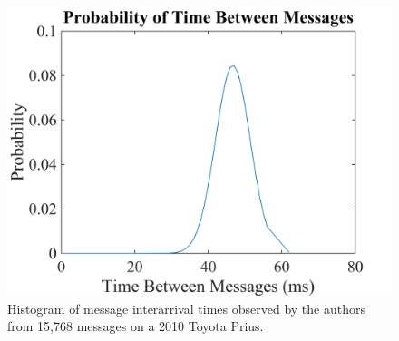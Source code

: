 	\selectfont
	\begin{figure}
		\centering
		\includegraphics[width=\columnwidth]{figures/pdf.png}
		\caption{{\selectfont Histogram 
		of message interarrival times observed by the authors from 
		15,768 messages on a 2010 Toyota Prius. }}
		\label{fig-msgdelay}
	\end{figure}
	
